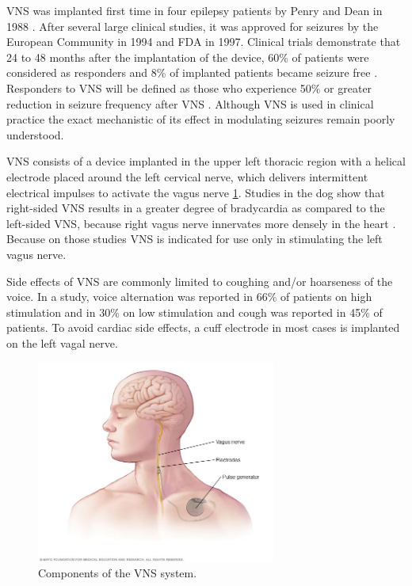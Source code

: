 VNS was implanted first time in four epilepsy patients by Penry and Dean in 1988 \cite{Penry1990}. After several large clinical studies, it was approved for seizures by the European Community in 1994 and FDA in 1997. Clinical trials demonstrate that 24 to 48 months after the implantation of the device, 60\% of patients were considered as responders and 8\% of implanted patients became seizure free \cite{Englot2016}. Responders to VNS will be defined as those who experience 50\% or greater reduction in seizure frequency after VNS \cite{IBRAHIM2017634}. Although VNS is used in clinical practice the exact mechanistic of its effect in modulating seizures remain poorly understood.

VNS consists of a device implanted in the upper left thoracic region with a helical electrode placed around the left cervical nerve, which delivers intermittent electrical impulses to activate the vagus nerve \ref{fig:Vagus Nerve Stimulation}.
Studies in the dog show that right-sided VNS results in a greater degree of bradycardia as compared to the left-sided VNS, because right vagus nerve innervates more densely in the heart \cite{ardell1986selective}. Because on those studies VNS is indicated for use only in stimulating the left vagus nerve.

Side effects of VNS are commonly limited to coughing and/or hoarseness of the voice. In a study, voice alternation was reported in 66\% of patients on high stimulation and in 30\% on low stimulation and cough was reported in 45\% of patients. \cite{ben2001vagus} To avoid cardiac side effects, a cuff electrode in most cases is implanted on the left vagal nerve.

\begin{figure}[h]
  \centering
  \includegraphics[width=0.7\textwidth]{images/vagus_nerve_stimulation.jpg}
  \caption{Components of the VNS system. \cite{MayoClinic}}
  \label{fig:Vagus Nerve Stimulation}
\end{figure}

